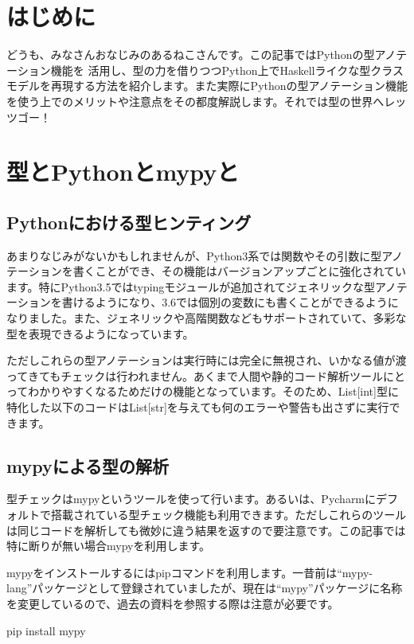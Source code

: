 \section{はじめに}
どうも、みなさんおなじみのあるねこさんです。この記事ではPythonの型アノテーション機能を
活用し、型の力を借りつつPython上でHaskellライクな型クラスモデルを再現する方法を紹介します。また実際にPythonの型アノテーション機能を使う上でのメリットや注意点をその都度解説します。それでは型の世界へレッツゴー！

\section{型とPythonとmypyと}
\subsection{Pythonにおける型ヒンティング}
あまりなじみがないかもしれませんが、Python3系では関数やその引数に型アノテーションを書くことができ、その機能はバージョンアップごとに強化されています。特にPython3.5ではtypingモジュールが追加されてジェネリックな型アノテーションを書けるようになり、3.6では個別の変数にも書くことができるようになりました。また、ジェネリックや高階関数などもサポートされていて、多彩な型を表現できるようになっています。

ただしこれらの型アノテーションは実行時には完全に無視され、いかなる値が渡ってきてもチェックは行われません。あくまで人間や静的コード解析ツールにとってわかりやすくなるためだけの機能となっています。そのため、List[int]型に特化した以下のコードはList[str]を与えても何のエラーや警告も出さずに実行できます。


\subsection{mypyによる型の解析}
型チェックはmypyというツールを使って行います。あるいは、Pycharmにデフォルトで搭載されている型チェック機能も利用できます。ただしこれらのツールは同じコードを解析しても微妙に違う結果を返すので要注意です。この記事では特に断りが無い場合mypyを利用します。

mypyをインストールするにはpipコマンドを利用します。一昔前は``mypy-lang''パッケージとして登録されていましたが、現在は``mypy''パッケージに名称を変更しているので、過去の資料を参照する際は注意が必要です。

\begin{bashcode}
pip install mypy
\end{bashcode}

